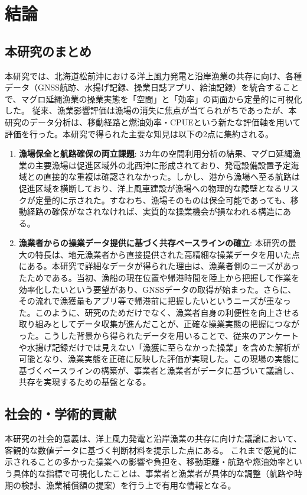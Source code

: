 \chapter{結論}

\section{本研究のまとめ}
本研究では、北海道松前沖における洋上風力発電と沿岸漁業の共存に向け、各種データ（GNSS航跡、水揚げ記録、操業日誌アプリ、給油記録）を統合することで、マグロ延縄漁業の操業実態を「空間」と「効率」の両面から定量的に可視化した。
従来、漁業影響評価は漁場の消失に焦点が当てられがちであったが、本研究のデータ分析は、移動経路と燃油効率・CPUEという新たな評価軸を用いて評価を行った。本研究で得られた主要な知見は以下の2点に集約される。

\begin{enumerate}
    \item \textbf{漁場保全と航路確保の両立課題}:
        3カ年の空間利用分析の結果、マグロ延縄漁業の主要漁場は促進区域外の北西沖に形成されており、発電設備設置予定海域との直接的な重複は確認されなかった。しかし、港から漁場へ至る航路は促進区域を横断しており、洋上風車建設が漁場への物理的な障壁となるリスクが定量的に示された。すなわち、漁場そのものは保全可能であっても、移動経路の確保がなされなければ、実質的な操業機会が損なわれる構造にある。

    \item \textbf{漁業者からの操業データ提供に基づく共存ベースラインの確立}:
        本研究の最大の特長は、地元漁業者から直接提供された高精細な操業データを用いた点にある。本研究で詳細なデータが得られた理由は、漁業者側のニーズがあったためである。当初、漁船の現在位置や帰港時間を陸上から把握して作業を効率化したいという要望があり、GNSSデータの取得が始まった。さらに、その流れで漁獲量もアプリ等で帰港前に把握したいというニーズが重なった。このように、研究のためだけでなく、漁業者自身の利便性を向上させる取り組みとしてデータ収集が進んだことが、正確な操業実態の把握につながった。こうした背景から得られたデータを用いることで、従来のアンケートや水揚げ記録だけでは見えない「漁獲に至らなかった操業」を含めた解析が可能となり、漁業実態を正確に反映した評価が実現した。この現場の実態に基づくベースラインの構築が、事業者と漁業者がデータに基づいて議論し、共存を実現するための基盤となる。
\end{enumerate}

\section{社会的・学術的貢献}
本研究の社会的意義は、洋上風力発電と沿岸漁業の共存に向けた議論において、客観的な数値データに基づく判断材料を提示した点にある。
これまで感覚的に示されることの多かった操業への影響や負担を、移動距離・航路や燃油効率という具体的な指標で可視化したことは、事業者と漁業者が具体的な調整（航路や時期の検討、漁業補償額の提案）を行う上で有用な情報となる。

